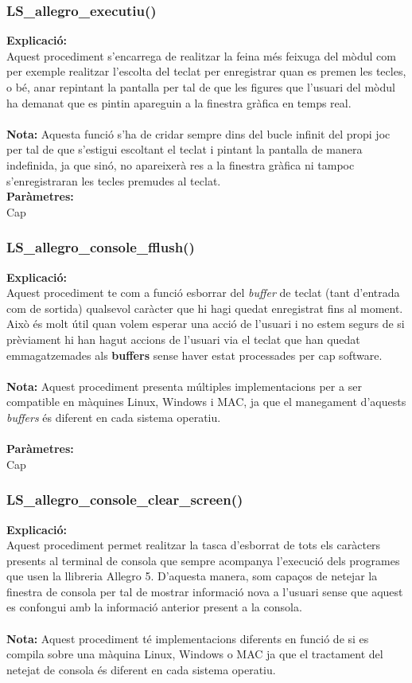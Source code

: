 \documentclass[11pt]{article}
\begin{document}
\pagebreak
\subsubsection{LS\_allegro\_executiu()}
\textbf{Explicació:}\\
Aquest procediment s'encarrega de realitzar la feina més feixuga del mòdul com per exemple realitzar l'escolta del teclat per enregistrar quan es premen les tecles, o bé, anar repintant la pantalla per tal de que les figures que l'usuari del mòdul ha demanat que es pintin apareguin a la finestra gràfica en temps real. \\\\
\textbf{Nota:} Aquesta funció s'ha de cridar sempre dins del bucle infinit del propi joc per tal de que s'estigui escoltant el teclat i pintant la pantalla de manera indefinida, ja que sinó, no apareixerà res a la finestra gràfica ni tampoc s'enregistraran les tecles premudes al teclat.\\

\noindent \textbf{Paràmetres:}\\
Cap

\subsubsection{LS\_allegro\_console\_fflush()}
\textbf{Explicació:}\\
Aquest procediment te com a funció esborrar del \textit{buffer} de teclat (tant d'entrada com de sortida) qualsevol caràcter que hi hagi quedat enregistrat fins al moment. Això és molt útil quan volem esperar una acció de l'usuari i no estem segurs de si prèviament hi han hagut accions de l'usuari via el teclat que han quedat emmagatzemades als \textbf{buffers} sense haver estat processades per cap software.\\\\
\textbf{Nota:} Aquest procediment presenta múltiples implementacions per a ser compatible en màquines Linux, Windows i MAC, ja que el manegament d'aquests \textit{buffers} és diferent en cada sistema operatiu.\\\\
\textbf{Paràmetres:}\\ Cap

\pagebreak
\subsubsection{LS\_allegro\_console\_clear\_screen()}
\textbf{Explicació:}\\
Aquest procediment permet realitzar la tasca d'esborrat de tots els caràcters presents al terminal de consola que sempre acompanya l'execució dels programes que usen la llibreria Allegro 5. D'aquesta manera, som capaços de netejar la finestra de consola per tal de mostrar informació nova a l'usuari sense que aquest es confongui amb la informació anterior present a la consola.\\\\
\textbf{Nota:} Aquest procediment té implementacions diferents en funció de si es compila sobre una màquina Linux, Windows o MAC ja que el tractament del netejat de consola és diferent en cada sistema operatiu.\\
\end{document}
